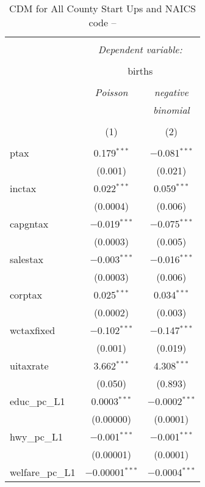 
\begin{table}[!htbp] \centering 
  \caption{CDM for All County Start Ups and NAICS code --} 
  \label{} 
\begin{tabular}{@{\extracolsep{5pt}}lcc} 
\\[-1.8ex]\hline 
\hline \\[-1.8ex] 
 & \multicolumn{2}{c}{\textit{Dependent variable:}} \\ 
\cline{2-3} 
\\[-1.8ex] & \multicolumn{2}{c}{births} \\ 
\\[-1.8ex] & \textit{Poisson} & \textit{negative} \\ 
 & \textit{} & \textit{binomial} \\ 
\\[-1.8ex] & (1) & (2)\\ 
\hline \\[-1.8ex] 
 ptax & 0.179$^{***}$ & $-$0.081$^{***}$ \\ 
  & (0.001) & (0.021) \\ 
  inctax & 0.022$^{***}$ & 0.059$^{***}$ \\ 
  & (0.0004) & (0.006) \\ 
  capgntax & $-$0.019$^{***}$ & $-$0.075$^{***}$ \\ 
  & (0.0003) & (0.005) \\ 
  salestax & $-$0.003$^{***}$ & $-$0.016$^{***}$ \\ 
  & (0.0003) & (0.006) \\ 
  corptax & 0.025$^{***}$ & 0.034$^{***}$ \\ 
  & (0.0002) & (0.003) \\ 
  wctaxfixed & $-$0.102$^{***}$ & $-$0.147$^{***}$ \\ 
  & (0.001) & (0.019) \\ 
  uitaxrate & 3.662$^{***}$ & 4.308$^{***}$ \\ 
  & (0.050) & (0.893) \\ 
  educ\_pc\_L1 & 0.0003$^{***}$ & $-$0.0002$^{***}$ \\ 
  & (0.00000) & (0.0001) \\ 
  hwy\_pc\_L1 & $-$0.001$^{***}$ & $-$0.001$^{***}$ \\ 
  & (0.00001) & (0.0001) \\ 
  welfare\_pc\_L1 & $-$0.00001$^{***}$ & $-$0.0004$^{***}$ \\ 

\end{tabular}
\end{table}
